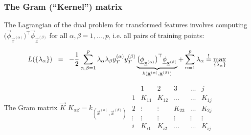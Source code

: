 \begin{frame}\frametitle{The Gram (``Kernel'') matrix}

The Lagrangian of the dual problem for transformed features involves computing $\big( \vec \phi_{\vec{x}^{(\alpha)}} \big)^\top 
            \vec \phi_{\vec{x}^{(\beta)}}$ for all $\alpha,\beta=1,\ldots,p$, i.e. all pairs of training points:

\begin{equation} 
    L(\{\lambda_\alpha\})
        \;\;=\;\;  -\frac{1}{2} \sum\limits_{\alpha, \beta = 1}^p 
        \lambda_\alpha \lambda_\beta y_T^{(\alpha)}
        y_T^{(\beta)} 
        \underbrace{\big( \underline{\mathbf{\phi}}_{\underline{\mathbf{x}}^{(\alpha)}} \big)^\top 
            \underline{\mathbf{\phi}}_{\underline{\mathbf{x}}^{(\beta)}}}_{ k(\underline{\mathbf{x}}^{(\alpha)}, \underline{\mathbf{x}}^{(\beta)})  }
        + \sum\limits_{\alpha = 1}^p \lambda_\alpha{}
        \stackrel{\mathrm{!}}{=} \max_{\{\lambda_\alpha\}}
\end{equation}


\begin{block}{The Gram matrix $\vec K$} 
		$K_{\alpha\beta} = k_{(\vec{x}^{(\alpha)}, \vec{x}^{(\beta)})}$
		\hspace{1cm}
		$\begin{array}{c|ccccc}
		  & 1      & 2      & 3      & \ldots & j      \\
		  \hline
		  1	& K_{11} & K_{12} & \ldots & \ldots & K_{1j} \\
		  2 	& \vdots & \vdots & K_{23} & \ldots & K_{2j} \\
		  \vdots 	& \vdots & \vdots & \vdots & \vdots & \vdots \\
		  i	& K_{i1} & K_{i2} & \ldots & \ldots & K_{ij}
		\end{array}
		$
	\end{block}
	


\pause


\end{frame}

